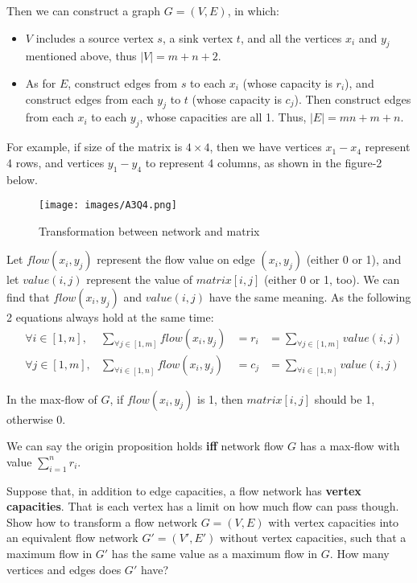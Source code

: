 \documentclass{article}
\newcounter{exercise}
\newcommand{\<}{
    \langle}
\renewcommand{\>}{
    \rangle}
\begin{document}
{Then we can construct a graph $G=(V,E)$, in which:
\begin{itemize}
    \item $V$ includes a source vertex $s$, a sink vertex $t$, and all the vertices $x_i$ and $y_j$ mentioned above, thus $|V| = m+n+2$.
    \item As for $E$, construct edges from $s$ to each $x_i$ (whose capacity is $r_i$), and construct edges from each $y_j$ to $t$ (whose capacity is $c_j$). Then construct edges from each $x_i$ to each $y_j$, whose capacities are all 1. Thus, $|E| = mn+m+n$.
\end{itemize}

For example, if size of the matrix is $4 \times 4$, then we have vertices $x_1 - x_4$ represent 4 rows, and vertices $y_1 - y_4$ to represent 4 columns, as shown in the figure-2 below.

\newpage

\begin{figure}[htp]
    \centering
    \texttt{[image: images/A3Q4.png]}
    \caption{Transformation between network and matrix}
\end{figure}

Let $flow(x_i, y_j)$ represent the flow value on edge $(x_i, y_j)$ (either 0 or 1), and let $value(i, j)$ represent the value of $matrix[i, j]$ (either 0 or 1, too). We can find that $flow(x_i, y_j)$ and $value(i,j)$ have the same meaning. As the following 2 equations always hold at the same time:
$$
\begin{aligned}
  &\forall{i \in [1, n]}, & \sum_{\forall{j \in [1, m]}}{flow(x_i, y_j)} &= r_i &= \sum_{\forall{j \in [1, m]}}{value(i,j)} \\
  &\forall{j \in [1, m]}, & \sum_{\forall{i \in [1, n]}}{flow(x_i, y_j)} &= c_j &= \sum_{\forall{i \in [1, n]}}{value(i,j)}
\end{aligned}
$$

In the max-flow of $G$, if $flow(x_i, y_j)$ is 1, then $matrix[i, j]$ should be 1, otherwise 0.

We can say the origin proposition holds \textbf{iff} network flow $G$ has a max-flow with value $\sum_{i=1}^{n}{r_i}$.

\begin{exercise}
Suppose that, in addition to edge capacities, a flow network has \textbf{vertex capacities}.
That is each vertex has a limit on how much flow can pass though. Show how to transform a flow network $G=(V,E)$ with vertex capacities into an equivalent flow network $G'=(V',E')$ without vertex capacities, such that a maximum flow in $G'$ has the same value as a maximum flow in $G$. How many vertices and edges does $G'$ have?
\end{exercise}

}
\end{document}
